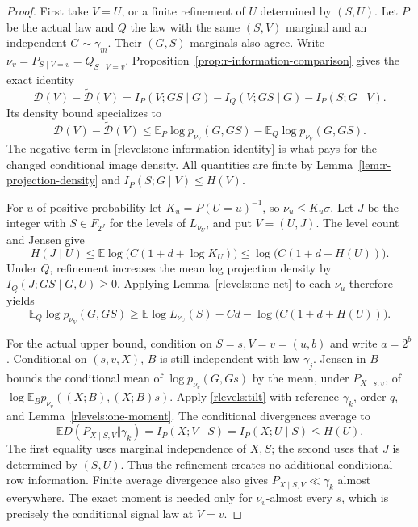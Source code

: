\begin{proof}
First take \(V=U\), or a finite refinement of \(U\) determined by
\((S,U)\).  Let \(P\) be the actual law and \(Q\) the law with the
same \((S,V)\) marginal and an independent \(G\sim\gamma_m\).
Their \((G,S)\) marginals also agree.  Write
\(\nu_v=P_{S\mid V=v}=Q_{S\mid V=v}\).
Proposition~\ref{prop:r-information-comparison} gives the exact identity
\begin{equation}\label{rlevels:one-information-identity}
 \mathcal D(V)-\widetilde{\mathcal D}(V)
 =I_P(V;GS\mid G)-I_Q(V;GS\mid G)-I_P(S;G\mid V).
\end{equation}
Its density bound specializes to
\begin{equation}\label{rlevels:one-density-comparison}
 \mathcal D(V)-\widetilde{\mathcal D}(V)
 \le \mathbb E_P\log p_{\nu_V}(G,GS)
       -\mathbb E_Q\log p_{\nu_V}(G,GS).
\end{equation}
The negative term in \eqref{rlevels:one-information-identity} is
what pays for the changed conditional image density.  All quantities
are finite by Lemma~\ref{lem:r-projection-density} and
\(I_P(S;G\mid V)\le H(V)\).

For \(u\) of positive probability let \(K_u=P(U=u)^{-1}\), so
\(\nu_u\le K_u\sigma\).  Let \(J\) be the integer with
\(S\in F_{2^J}\) for the levels of \(L_{\nu_U}\), and put
\(V=(U,J)\).  The level count and Jensen give
\begin{equation}\label{rlevels:one-label-entropy}
 H(J\mid U)
 \le \mathbb E\log\!\bigl(C(1+d+\log K_U)\bigr)
 \le \log\!\bigl(C(1+d+H(U))\bigr).
\end{equation}
Under \(Q\), refinement increases the mean log projection density
by \(I_Q(J;GS\mid G,U)\ge0\).  Applying
Lemma~\ref{rlevels:one-net} to each \(\nu_u\) therefore yields
\begin{equation}\label{rlevels:one-independent-lower}
 \mathbb E_Q\log p_{\nu_V}(G,GS)
 \ge \mathbb E\log L_{\nu_U}(S)-Cd
       -\log\!\bigl(C(1+d+H(U))\bigr).
\end{equation}

For the actual upper bound, condition on \(S=s,V=v=(u,b)\) and
write \(a=2^b\).  Conditional on \((s,v,X)\), \(B\) is still
independent with law \(\gamma_j\).  Jensen in \(B\) bounds the
conditional mean of \(\log p_{\nu_v}(G,Gs)\) by the mean, under
\(P_{X\mid s,v}\), of
\(\log\mathbb E_Bp_{\nu_v}((X;B),(X;B)s)\).
Apply \eqref{rlevels:tilt} with reference \(\gamma_k\), order
\(q\), and Lemma~\ref{rlevels:one-moment}.  The conditional
divergences average to
\begin{equation}\label{rlevels:one-row-kl}
 \mathbb E D(P_{X\mid S,V}\Vert\gamma_k)
 =I_P(X;V\mid S)=I_P(X;U\mid S)\le H(U).
\end{equation}
The first equality uses marginal independence of \(X,S\); the
second uses that \(J\) is determined by \((S,U)\).  Thus the
refinement creates no additional conditional row information.
Finite average divergence also gives \(P_{X\mid S,V}\ll\gamma_k\)
almost everywhere.  The exact moment is needed only for
\(\nu_v\)-almost every \(s\), which is precisely the conditional
signal law at \(V=v\).


\end{proof}
